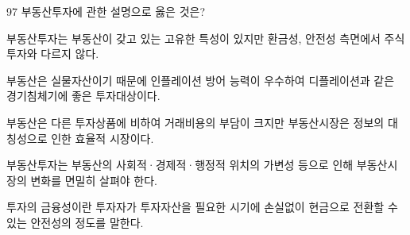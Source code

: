 \begin{question}{97}
부동산투자에 관한 설명으로 옳은 것은?
\begin{choices}
  \item 부동산투자는 부동산이 갖고 있는 고유한 특성이 있지만 환금성, 안전성 측면에서 주식 투자와 다르지 않다.
  \item 부동산은 실물자산이기 때문에 인플레이션 방어 능력이 우수하여 디플레이션과 같은 경기침체기에 좋은 투자대상이다.
  \item 부동산은 다른 투자상품에 비하여 거래비용의 부담이 크지만 부동산시장은 정보의 대칭성으로 인한 효율적 시장이다.
  \item 부동산투자는 부동산의 사회적·경제적·행정적 위치의 가변성 등으로 인해 부동산시장의 변화를 면밀히 살펴야 한다.
  \item 투자의 금융성이란 투자자가 투자자산을 필요한 시기에 손실없이 현금으로 전환할 수 있는 안전성의 정도를 말한다.
\end{choices}
\end{question}
